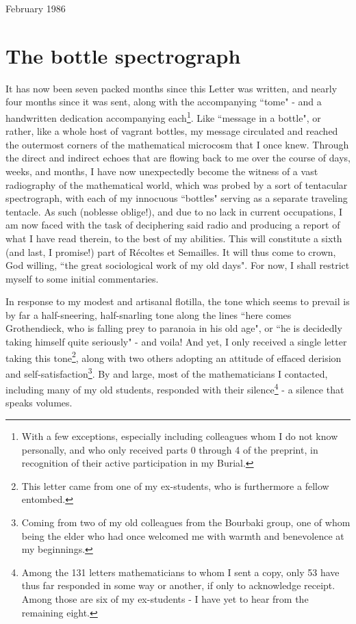 \begin{flushright}
February 1986
\end{flushright} 

\section{The bottle spectrograph}

It has now been seven packed months since this Letter was written, and nearly four months since it was sent, along with the accompanying ``tome" - and a handwritten dedication accompanying each\footnote{With a few exceptions, especially including colleagues whom I do not know personally, and who only received parts 0 through 4 of the preprint, in recognition of their active participation in my Burial.}. Like ``message in a bottle", or rather, like a whole host of vagrant bottles, my message circulated and reached the outermost corners of the mathematical microcosm that I once knew. Through the direct and indirect echoes that are flowing back to me over the course of days, weeks, and months, I have now unexpectedly become the witness of a vast radiography of the mathematical world, which was probed by a sort of tentacular spectrograph, with each of my innocuous ``bottles" serving as a separate traveling tentacle. As such (noblesse oblige!), and due to no lack in current occupations, I am now faced with the task of deciphering said radio and producing a report of what I have read therein, to the best of my abilities. This will constitute a sixth (and last, I promise!) part of R\'ecoltes et Semailles. It will thus come to crown, God willing, ``the great sociological work of my old days". For now, I shall restrict myself to some initial commentaries.

In response to my modest and artisanal flotilla, the tone which seems to prevail is by far a half-sneering, half-snarling tone along the lines ``here comes Grothendieck, who is falling prey to paranoia in his old age", or ``he is decidedly taking himself quite seriously" - and voila! And yet, I only received a single letter taking this tone\footnote{This letter came from one of my ex-students, who is furthermore a fellow entombed.}, along with two others adopting an attitude of effaced derision and self-satisfaction\footnote{Coming from two of my old colleagues from the Bourbaki group, one of whom being the elder who had once welcomed me with warmth and benevolence at my beginnings.}. By and large, most of the mathematicians I contacted, including many of my old students, responded with their silence\footnote{Among the 131 letters mathematicians to whom I sent a copy, only 53 have thus far responded in some way or another, if only to acknowledge receipt. Among those are six of my ex-students - I have yet to hear from the remaining eight.} - a silence that speaks volumes.

